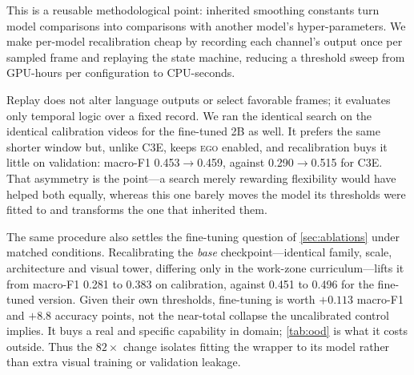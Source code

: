 \documentclass[10pt,twocolumn,letterpaper]{article}
\begin{document}
This is a reusable methodological point: inherited smoothing constants turn model comparisons into comparisons with another model's hyper-parameters.  We make per-model recalibration cheap by recording each channel's output once per sampled frame and replaying the state machine, reducing a threshold sweep from GPU-hours per configuration to CPU-seconds.

Replay does not alter language outputs or select favorable frames; it evaluates only temporal logic over a fixed record.  We ran the identical search on the identical calibration videos for the fine-tuned 2B as well.  It prefers the same shorter window but, unlike C3E, keeps \textsc{ego} enabled, and recalibration buys it little on validation: macro-F1 0.453$\to$0.459, against 0.290$\to$0.515 for C3E.  That asymmetry is the point---a search merely rewarding flexibility would have helped both equally, whereas this one barely moves the model its thresholds were fitted to and transforms the one that inherited them.

The same procedure also settles the fine-tuning question of \cref{sec:ablations} under matched conditions.  Recalibrating the \emph{base} checkpoint---identical family, scale, architecture and visual tower, differing only in the work-zone curriculum---lifts it from macro-F1 0.281 to 0.383 on calibration, against 0.451 to 0.496 for the fine-tuned version.  Given their own thresholds, fine-tuning is worth $+0.113$ macro-F1 and $+8.8$ accuracy points, not the near-total collapse the uncalibrated control implies.  It buys a real and specific capability in domain; \cref{tab:ood} is what it costs outside.  Thus the $82\times$ change isolates fitting the wrapper to its model rather than extra visual training or validation leakage.
\end{document}

